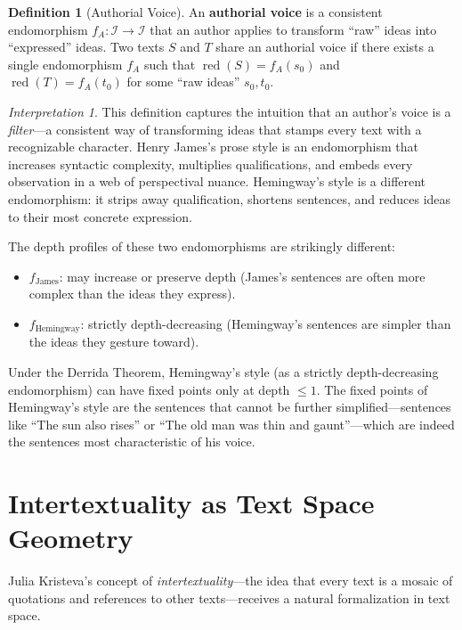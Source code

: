 \documentclass[11pt,openany]{book}
\theoremstyle{definition}
\newtheorem{definition}[axiom]{Definition}
\theoremstyle{plain}
\theoremstyle{remark}
\newtheorem{interpretation}[axiom]{Interpretation}
\newcommand{\IS}{\mathcal{I}}               %
\begin{document}
\begin{definition}[Authorial Voice]
An \textbf{authorial voice} is a consistent endomorphism $f_A : \IS \to \IS$ that an author applies to transform ``raw'' ideas into ``expressed'' ideas. Two texts $S$ and $T$ share an authorial voice if there exists a single endomorphism $f_A$ such that $\operatorname{red}(S) = f_A(s_0)$ and $\operatorname{red}(T) = f_A(t_0)$ for some ``raw ideas'' $s_0, t_0$.
\end{definition}

\begin{interpretation}
This definition captures the intuition that an author's voice is a \emph{filter}---a consistent way of transforming ideas that stamps every text with a recognizable character. Henry James's prose style is an endomorphism that increases syntactic complexity, multiplies qualifications, and embeds every observation in a web of perspectival nuance. Hemingway's style is a different endomorphism: it strips away qualification, shortens sentences, and reduces ideas to their most concrete expression.

The depth profiles of these two endomorphisms are strikingly different:
\begin{itemize}
\item $f_{\text{James}}$: may increase or preserve depth (James's sentences are often more complex than the ideas they express).
\item $f_{\text{Hemingway}}$: strictly depth-decreasing (Hemingway's sentences are simpler than the ideas they gesture toward).
\end{itemize}

Under the Derrida Theorem, Hemingway's style (as a strictly depth-decreasing endomorphism) can have fixed points only at depth $\leq 1$. The fixed points of Hemingway's style are the sentences that cannot be further simplified---sentences like ``The sun also rises'' or ``The old man was thin and gaunt''---which are indeed the sentences most characteristic of his voice.
\end{interpretation}

\section{Intertextuality as Text Space Geometry}

Julia Kristeva's concept of \emph{intertextuality}---the idea that every text is a mosaic of quotations and references to other texts---receives a natural formalization in text space.
\end{document}
